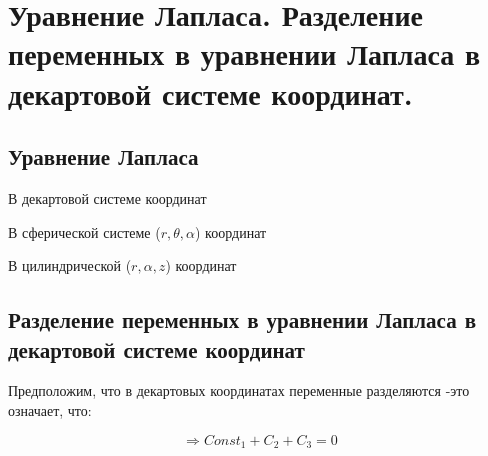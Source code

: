 \section{Уравнение Лапласа. Разделение переменных в уравнении Лапласа в
декартовой системе координат.}

\subsection*{Уравнение Лапласа}

В декартовой системе координат


В сферической системе ($r,\theta,\alpha$) координат


В цилиндрической ($r,\alpha,z$) координат


\subsection*{Разделение переменных в уравнении Лапласа в
декартовой системе координат}

Предположим, что в декартовых координатах переменные разделяются -это означает, что: 



\[
    \Rightarrow Const_1+C_2+C_3=0
\]


